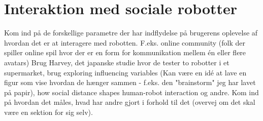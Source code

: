 \section{Interaktion med sociale robotter}
\label{InteraktionSocialeRobotter}
%
Kom ind på de forskellige parametre der har indflydelse på brugerens oplevelse af hvordan det er at interagere med robotten. F.eks. online community (folk der spiller online spil hvor der er en form for kommunikation mellem én eller flere avatars) \blankline
%
Brug Harvey, det japanske studie hvor de tester to robotter i et supermarket, brug exploring influencing variables (Kan være en idé at lave en figur som vise hvordan de hænger sammen - f.eks. den "brainstorm" jeg har lavet på papir), how social distance shapes human-robot interaction og andre. \blankline
%
Kom ind på hvordan det måles, hvad har andre gjort i forhold til det (overvej om det skal være en sektion for sig selv).
